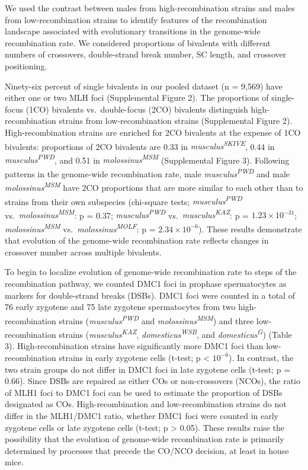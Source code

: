 \documentclass[
]{article}
\begin{document}
We used the contrast between males from high-recombination strains and
males from low-recombination strains to identify features of the
recombination landscape associated with evolutionary transitions in the
genome-wide recombination rate. We considered proportions of bivalents
with different numbers of crossovers, double-strand break number, SC
length, and crossover positioning.

Ninety-six percent of single bivalents in our pooled dataset (n = 9,569)
have either one or two MLH foci (Supplemental Figure 2). The proportions
of single-focus (1CO) bivalents vs.~double-focus (2CO) bivalents
distinguish high-recombination strains from low-recombination strains
(Supplemental Figure 2). High-recombination strains are enriched for 2CO
bivalents at the expense of 1CO bivalents: proportions of 2CO bivalents
are 0.33 in \emph{musculus\textsuperscript{SKIVE}}, 0.44 in
\emph{musculus\textsuperscript{PWD}}, and 0.51 in
\emph{molossinus\textsuperscript{MSM}} (Supplemental Figure 3).
Following patterns in the genome-wide recombination rate, male
\emph{musculus\textsuperscript{PWD}} and male
\emph{molossinus\textsuperscript{MSM}} have 2CO proportions that are
more similar to each other than to strains from their own subspecies
(chi-square tests; \emph{musculus\textsuperscript{PWD}}
vs.~\emph{molossinus\textsuperscript{MSM}}: p = 0.37;
\emph{musculus\textsuperscript{PWD}}
vs.~\emph{musculus\textsuperscript{KAZ}}: p =
\ensuremath{1.23\times 10^{-31}}; \emph{molossinus\textsuperscript{MSM}}
vs.~\emph{molossinus\textsuperscript{MOLF}}: p =
\ensuremath{2.34\times 10^{-6}}). These results demonstrate that
evolution of the genome-wide recombination rate reflects changes in
crossover number across multiple bivalents.

To begin to localize evolution of genome-wide recombination rate to
steps of the recombination pathway, we counted DMC1 foci in prophase
spermatocytes as markers for double-strand breaks (DSBs). DMC1 foci were
counted in a total of 76 early zygotene and 75 late zygotene
spermatocytes from two high-recombination strains
(\emph{musculus\textsuperscript{PWD}} and
\emph{molossinus\textsuperscript{MSM}}) and three low-recombination
strains (\emph{musculus\textsuperscript{KAZ}},
\emph{domesticus\textsuperscript{WSB}}, and
\emph{domesticus\textsuperscript{G}}) (Table 3). High-recombination
strains have significantly more DMC1 foci than low-recombination strains
in early zygotene cells (t-test; p \textless{} \ensuremath{10^{-6}}). In
contrast, the two strain groups do not differ in DMC1 foci in late
zygotene cells (t-test; p = 0.66). Since DSBs are repaired as either COs
or non-crossovers (NCOs), the ratio of MLH1 foci to DMC1 foci can be
used to estimate the proportion of DSBs designated as COs.
High-recombination and low-recombination strains do not differ in the
MLH1/DMC1 ratio, whether DMC1 foci were counted in early zygotene cells
or late zygotene cells (t-test; p \textgreater{} 0.05). These results
raise the possibility that the evolution of genome-wide recombination
rate is primarily determined by processes that precede the CO/NCO
decision, at least in house mice.
\end{document}
